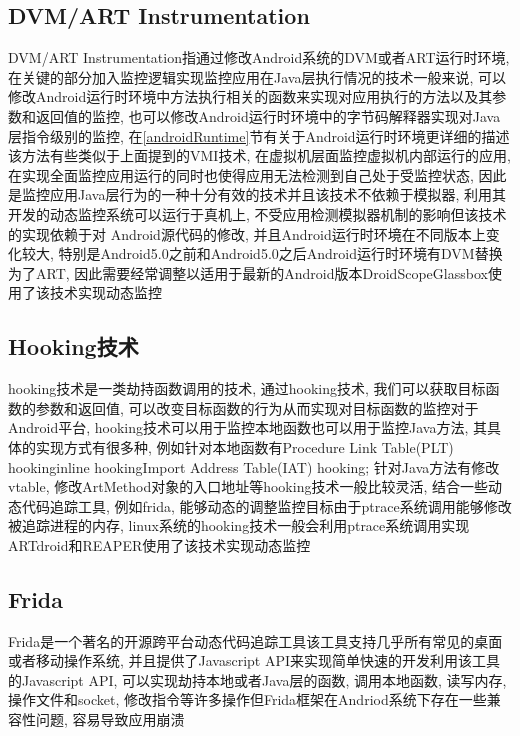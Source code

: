 \subsection{DVM/ART Instrumentation}
\label{artInstr}
DVM/ART Instrumentation指通过修改Android系统的DVM或者ART运行时环境, 在关键的部分加入监控逻辑实现监控应用在Java层执行情况的技术\juhao 一般来说, 可以修改Android运行时环境中方法执行相关的函数来实现对应用执行的方法以及其参数和返回值的监控, 也可以修改Android运行时环境中的字节码解释器实现对Java层指令级别的监控, 在\ref{androidRuntime}节有关于Android运行时环境更详细的描述\juhao 该方法有些类似于上面提到的VMI技术, 在虚拟机层面监控虚拟机内部运行的应用, 在实现全面监控应用运行的同时也使得应用无法检测到自己处于受监控状态, 因此是监控应用Java层行为的一种十分有效的技术\juhao 并且该技术不依赖于模拟器, 利用其开发的动态监控系统可以运行于真机上, 不受应用检测模拟器机制的影响\juhao 但该技术的实现依赖于对
Android源代码的修改, 并且Android运行时环境在不同版本上变化较大, 特别是Android5.0之前和Android5.0之后Android运行时环境有DVM替换为了ART, 因此需要经常调整以适用于最新的Android版本\juhao DroidScope\dunhao Glassbox使用了该技术实现动态监控\juhao

\subsection{Hooking技术}
hooking技术是一类劫持函数调用的技术, 通过hooking技术, 我们可以获取目标函数的参数和返回值, 可以改变目标函数的行为从而实现对目标函数的监控\juhao 对于Android平台, hooking技术可以用于监控本地函数也可以用于监控Java方法, 其具体的实现方式有很多种, 例如针对本地函数有Procedure Link Table(PLT) hooking\dunhao inline hooking\dunhao Import Address Table(IAT) hooking; 针对Java方法有修改vtable, 修改ArtMethod对象的入口地址等\juhao hooking技术一般比较灵活, 结合一些动态代码追踪工具, 例如frida, 能够动态的调整监控目标\juhao 由于ptrace系统调用能够修改被追踪进程的内存, linux系统的hooking技术一般会利用ptrace系统调用实现\juhao ARTdroid和REAPER使用了该技术实现动态监控\juhao

\subsection{Frida}
\label{frida}
Frida是一个著名的开源跨平台动态代码追踪工具\juhao 该工具支持几乎所有常见的桌面或者移动操作系统, 并且提供了Javascript API来实现简单快速的开发\juhao 利用该工具的Javascript API, 可以实现劫持本地或者Java层的函数, 调用本地函数, 读写内存, 操作文件和socket, 修改指令等许多操作\juhao 但Frida框架在Andriod系统下存在一些兼容性问题, 容易导致应用崩溃\juhao 

